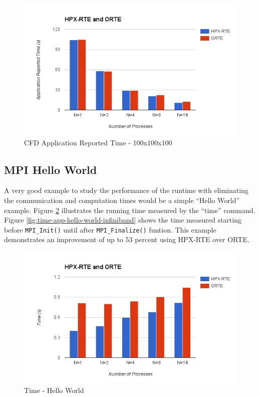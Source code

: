 \begin{figure}[h!]
\centering
\includegraphics[scale=0.7]{images/time-app-heatsolver-100-infiniband.png}
\caption[CFD Application Reported Time - 100x100x100]{CFD Application Reported Time - 100x100x100}
\label{fig:time-app-heatsolver-100-infiniband}
\end{figure}


\subsection{MPI Hello World}
A very good example to study the performance of the runtime with eliminating the communication and computation times would be a simple ``Hello World'' example. Figure \ref{fig:time-all-hello-world-infiniband} illustrates the running time measured by the ``time'' command. Figure \ref{fig:time-app-hello-world-infiniband} shows the time measured starting before \verb|MPI_Init()| until after \verb|MPI_Finalize()| funtion. This example demonstrates an improvement of up to 53 percent using HPX-RTE over ORTE.

\begin{figure}[h!]
\centering
\includegraphics[scale=0.7]{images/time-all-hello-world-infiniband.png}
\caption[Time - Hello World]{Time - Hello World}
\label{fig:time-all-hello-world-infiniband}
\end{figure}

